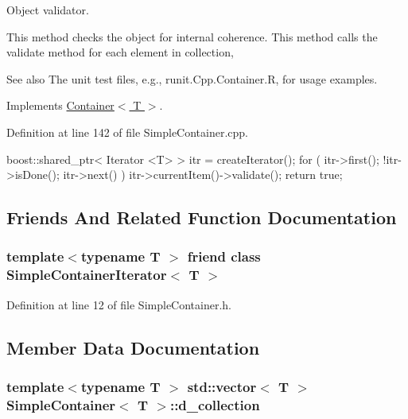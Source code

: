 Object validator. 

This method checks the object for internal coherence. This method calls the validate method for each element in collection, \begin{DoxySeeAlso}{See also}
The unit test files, e.g., runit.Cpp.Container.R, for usage examples. 
\end{DoxySeeAlso}


Implements \hyperlink{class_container_abbd8ca2714a550351442f4410cf5736d}{Container$<$ T $>$}.



Definition at line 142 of file SimpleContainer.cpp.


\begin{DoxyCode}
  {
     boost::shared_ptr< Iterator <T> >  itr = createIterator();
     for ( itr->first(); !itr->isDone(); itr->next() ) {
        itr->currentItem()->validate();
     }
  return true;
  }
\end{DoxyCode}


\subsection{Friends And Related Function Documentation}
\hypertarget{class_simple_container_a9abe836547cca50b94869af58a0901f7}{
\subsubsection[{SimpleContainerIterator$<$ T $>$}]{\setlength{\rightskip}{0pt plus 5cm}template$<$typename T $>$ friend class {\bf SimpleContainerIterator}$<$ T $>$}}
\label{class_simple_container_a9abe836547cca50b94869af58a0901f7}


Definition at line 12 of file SimpleContainer.h.



\subsection{Member Data Documentation}
\hypertarget{class_simple_container_a0be5592282fc09b51a344d4083a7daf9}{
\subsubsection[{d\_\-collection}]{\setlength{\rightskip}{0pt plus 5cm}template$<$typename T $>$ std::vector$<$ T $>$ {\bf SimpleContainer}$<$ T $>$::{\bf d\_\-collection}}}
\label{class_simple_container_a0be5592282fc09b51a344d4083a7daf9}


